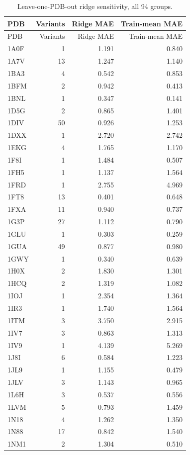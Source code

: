 \begin{longtable}{lrrr}
\caption{Leave-one-PDB-out ridge sensitivity, all 94 groups.}\label{tab:loo}\\
\hline PDB & Variants & Ridge MAE & Train-mean MAE\\\hline\endfirsthead
\hline PDB & Variants & Ridge MAE & Train-mean MAE\\\hline\endhead
1A0F & 1 & 1.191 & 0.840\\
1A7V & 13 & 1.247 & 1.140\\
1BA3 & 4 & 0.542 & 0.853\\
1BFM & 2 & 0.942 & 0.413\\
1BNL & 1 & 0.347 & 0.141\\
1D5G & 2 & 0.865 & 1.401\\
1DIV & 50 & 0.926 & 1.253\\
1DXX & 1 & 2.720 & 2.742\\
1EKG & 4 & 1.765 & 1.170\\
1F8I & 1 & 1.484 & 0.507\\
1FH5 & 1 & 1.137 & 1.564\\
1FRD & 1 & 2.755 & 4.969\\
1FT8 & 13 & 0.401 & 0.648\\
1FXA & 11 & 0.940 & 0.737\\
1G3P & 27 & 1.112 & 0.790\\
1GLU & 1 & 0.303 & 0.259\\
1GUA & 49 & 0.877 & 0.980\\
1GWY & 1 & 0.340 & 0.639\\
1H0X & 2 & 1.830 & 1.301\\
1HCQ & 2 & 1.319 & 1.082\\
1IOJ & 1 & 2.354 & 1.364\\
1IR3 & 1 & 1.740 & 1.564\\
1ITM & 3 & 3.750 & 2.915\\
1IV7 & 3 & 0.863 & 1.313\\
1IV9 & 1 & 4.139 & 5.269\\
1J8I & 6 & 0.584 & 1.223\\
1JL9 & 1 & 1.155 & 0.479\\
1JLV & 3 & 1.143 & 0.965\\
1L6H & 3 & 0.537 & 0.556\\
1LVM & 5 & 0.793 & 1.459\\
1N18 & 4 & 1.262 & 1.350\\
1N88 & 17 & 0.842 & 1.540\\
1NM1 & 2 & 1.304 & 0.510\\

\end{longtable}
